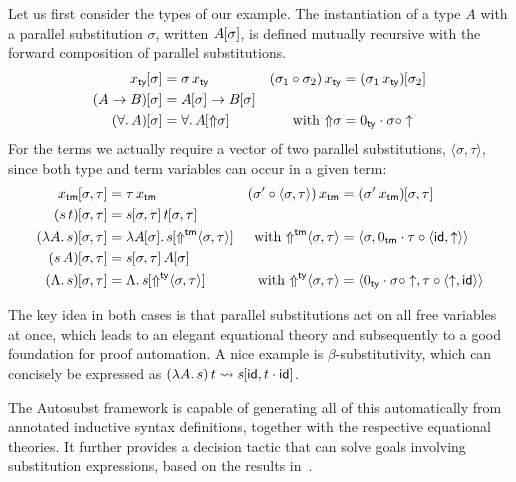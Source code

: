 \documentclass[a4paper,UKenglish]{lipics-v2016}
\newcommand{\ty}{\mathsf{ty}}
\newcommand{\tm}{\mathsf{tm}}
\newcommand{\All}{\ensuremath{\forall.\,}}
\newcommand{\Lam}[1]{\ensuremath{\lambda #1.\,}}
\newcommand{\TyLam}{\ensuremath{\Lambda.\,}}
\newcommand{\subst}[1]{\hphantom{|}\!\![{#1}]}
\newcommand{\scons}{\mathbin{\cdot}}
\newcommand{\scomp}{\mathbin{\circ}}
\newcommand{\id}{\mathsf{id}}
\newcommand{\up}{{\Uparrow}}
\newcommand{\shift}{\ensuremath{\uparrow}}
\theoremstyle{plain}
\begin{document}
Let us first consider the types of our example.
The instantiation of a type $A$ with a parallel substitution $\sigma$, written $A\subst\sigma$, is defined mutually recursive with the forward composition of parallel substitutions.
\begin{align*}
  x_\ty\subst\sigma &= \sigma\,x_\ty & (\sigma_1 \scomp \sigma_2)\,x_\ty &= (\sigma_1\,x_\ty)\subst{\sigma_2}\\
  (A\to B)\subst\sigma &= A\subst\sigma \to B\subst\sigma & &\\
  (\All A)\subst\sigma &= \All A\subst{\up\sigma} & \text{with } \up\sigma&= 0_\ty \scons \sigma \scomp \shift
\end{align*}
For the terms we actually require a vector of two parallel substitutions, $\langle\sigma,\tau\rangle$, since both type and term variables can occur in a given term:
\begin{align*}
  x_\tm\subst{\sigma,\tau} &= \tau\,x_\tm & (\sigma' \scomp \langle\sigma,\tau\rangle)\,x_\tm &= (\sigma'\,x_\tm)\subst{\sigma,\tau}\\
  (s\,t)\subst{\sigma,\tau} &= s\subst{\sigma,\tau}\,t\subst{\sigma,\tau} & &\\
  (\Lam A s)\subst{\sigma,\tau} &= \Lam {A\subst\sigma} {s\subst{\up^{\tm}\langle\sigma,\tau\rangle}} & \text{with } \up^{\tm}\langle\sigma,\tau\rangle &= \langle\sigma,0_\tm\scons\tau\scomp{\langle\id,\shift\rangle}\rangle\\
  (s\,A)\subst{\sigma,\tau} &= s\subst{\sigma,\tau}\,A\subst{\sigma} & &\\
  (\TyLam s)\subst{\sigma,\tau} &= \TyLam {s\subst{\up^{\ty}\langle\sigma,\tau\rangle}} & \text{with } \up^{\ty}\langle\sigma,\tau\rangle&= \langle 0_\ty \scons \sigma \scomp \shift, \tau \scomp \langle\shift,\id\rangle\rangle
\end{align*}

The key idea in both cases is that parallel substitutions act on all free variables at once, which leads to an elegant equational theory and subsequently to a good foundation for proof automation.
A nice example is $\beta$-substitutivity, which can concisely be expressed as $(\Lam A s)\,t\leadsto s\subst{\id,t\scons\id}$.

The Autosubst framework is capable of generating all of this automatically from annotated inductive syntax definitions, together with the respective equational theories.
It further provides a decision tactic that can solve goals involving substitution expressions, based on the results in~\cite{SchaeferEtAl:2009:Completeness}.
\end{document}
